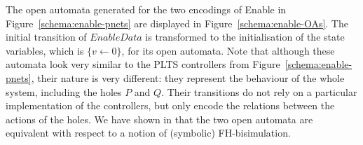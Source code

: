 \documentclass[smallcondensed]{svjour3}
\newcommand{\TODO}[1]{\textcolor{red}{\textbf{[TODO:#1]}}}
\newcommand{\QIN}[1]{\textcolor{airforceblue}{#1}}
\newcommand{\YX}[1]{{\color{red}#1}}
\begin{document}
The open automata generated for the two encodings of Enable in
Figure~\ref{schema:enable-pnets} are displayed in
Figure~\ref{schema:enable-OAs}. 
\QIN{The initial transition of $EnableData$ is transformed to the initialisation of the state variables, which is $\{v\leftarrow 0\}$, for its open automata.}
Note that although these automata look very similar to the PLTS
controllers from Figure~\ref{schema:enable-pnets}, their nature is very
different: they represent the behaviour of the whole system, including
the holes $P$ and $Q$. Their transitions do not rely on a particular
implementation of the controllers, but only encode the 
relations between the actions of the holes.
We have shown in \cite{henrio:Forte2016} 
\YX{that the two open automata are equivalent with respect to a notion of (symbolic) FH-bisimulation.}
 
\end{document}
